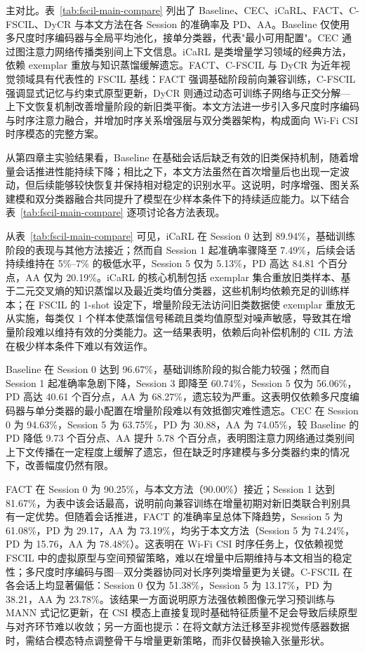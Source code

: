 主对比。表~\ref{tab:fscil-main-compare} 列出了 Baseline、CEC\cite{zhang2021cec}、iCaRL\cite{rebuffi2017icarl}、FACT\cite{zhou2022fact}、C-FSCIL\cite{hersche2022cfscil}、DyCR\cite{pan2025dycr} 与本文方法在各 Session 的准确率及 PD、AA。Baseline 仅使用多尺度时序编码器与全局平均池化，接单分类器，代表"最小可用配置"。CEC 通过图注意力网络传播类别间上下文信息。iCaRL 是类增量学习领域的经典方法，依赖 exemplar 重放与知识蒸馏缓解遗忘。FACT、C-FSCIL 与 DyCR 为近年视觉领域具有代表性的 FSCIL 基线：FACT 强调基础阶段前向兼容训练，C-FSCIL 强调显式记忆与约束式原型更新，DyCR 则通过动态可训练子网络与正交分解—上下文恢复机制改善增量阶段的新旧类平衡。本文方法进一步引入多尺度时序编码与时序注意力融合，并增加时序关系增强层与双分类器架构，构成面向 Wi-Fi CSI 时序模态的完整方案。

从第四章主实验结果看，Baseline 在基础会话后缺乏有效的旧类保持机制，随着增量会话推进性能持续下降；相比之下，本文方法虽然在首次增量后也出现一定波动，但后续能够较快恢复并保持相对稳定的识别水平。这说明，时序增强、图关系建模和双分类器融合共同提升了模型在少样本条件下的持续适应能力。以下结合表~\ref{tab:fscil-main-compare} 逐项讨论各方法表现。

从表~\ref{tab:fscil-main-compare} 可见，iCaRL 在 Session 0 达到 89.94\%，基础训练阶段的表现与其他方法接近；然而自 Session 1 起准确率骤降至 7.49\%，后续会话持续维持在 5\%--7\% 的极低水平，Session 5 仅为 5.13\%，PD 高达 84.81 个百分点，AA 仅为 20.19\%。iCaRL 的核心机制包括 exemplar 集合重放旧类样本、基于二元交叉熵的知识蒸馏以及最近类均值分类器，这些机制均依赖充足的训练样本；在 FSCIL 的 1-shot 设定下，增量阶段无法访问旧类数据使 exemplar 重放无从实施，每类仅 1 个样本使蒸馏信号稀疏且类均值原型对噪声敏感，导致其在增量阶段难以维持有效的分类能力。这一结果表明，依赖后向补偿机制的 CIL 方法在极少样本条件下难以有效运作。

Baseline 在 Session 0 达到 96.67\%，基础训练阶段的拟合能力较强；然而自 Session 1 起准确率急剧下降，Session 3 即降至 60.74\%，Session 5 仅为 56.06\%，PD 高达 40.61 个百分点，AA 为 68.27\%，遗忘较为严重。这表明仅依赖多尺度编码器与单分类器的最小配置在增量阶段难以有效抵御灾难性遗忘。CEC 在 Session 0 为 94.63\%，Session 5 为 63.75\%，PD 为 30.88，AA 为 74.05\%，较 Baseline 的 PD 降低 9.73 个百分点、AA 提升 5.78 个百分点，表明图注意力网络通过类别间上下文传播在一定程度上缓解了遗忘，但在缺乏时序建模与多分类器约束的情况下，改善幅度仍然有限。

FACT 在 Session 0 为 90.25\%，与本文方法（90.00\%）接近；Session 1 达到 81.67\%，为表中该会话最高，说明前向兼容训练在增量初期对新旧类联合判别具有一定优势。但随着会话推进，FACT 的准确率呈总体下降趋势，Session 5 为 61.08\%，PD 为 29.17，AA 为 73.19\%，均劣于本文方法（Session 5 为 74.24\%，PD 为 15.76，AA 为 78.48\%）。这表明在 Wi-Fi CSI 时序任务上，仅依赖视觉 FSCIL 中的虚拟原型与空间预留策略，难以在增量中后期维持与本文相当的稳定性；多尺度时序编码与图—双分类器协同对长序列类增量更为关键。C-FSCIL 在各会话上均显著偏低：Session 0 仅为 51.38\%，Session 5 为 13.17\%，PD 为 38.21，AA 为 23.78\%。该结果一方面说明原方法强依赖图像元学习预训练与 MANN 式记忆更新，在 CSI 模态上直接复现时基础特征质量不足会导致后续原型与对齐环节难以收敛；另一方面也提示：在将文献方法迁移至非视觉传感器数据时，需结合模态特点调整骨干与增量更新策略，而非仅替换输入张量形状。

